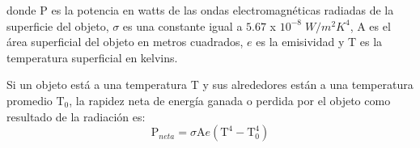   \PN donde P es la potencia en watts de las ondas electromagnéticas radiadas de la superficie del objeto, $\sigma$ es
  una constante igual a $5.67$ x $10^{-8} \; W/m^{2} K^{4}$, A es el área superficial del objeto en metros cuadrados,
  $e$ es la emisividad y T es la temperatura superficial en kelvins.

  \PN Si un objeto está a una temperatura T y sus alrededores están a una temperatura promedio T$_{0}$, la rapidez neta
  de energía ganada o perdida por el objeto como resultado de la radiación es:
  \begin{equation*}
    \text{P}_{neta} = \sigma \text{A} e \left(\text{T}^{4} - \text{T}_{0}^{4}\right)
  \end{equation*}
